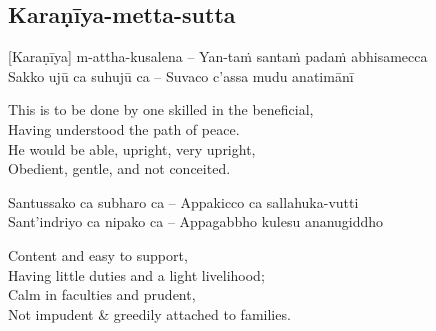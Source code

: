 



\subsection{Karaṇīya-metta-sutta}
\label{karaniya-metta-sutta}
[Karaṇīya] m-attha-kusalena – Yan-taṁ santaṁ padaṁ abhisamecca\\
Sakko ujū ca suhujū ca – Suvaco c’assa mudu anatimānī

\begin{english}
  This is to be done by one skilled in the beneficial,\\
  Having understood the path of peace.\\
  He would be able, upright, very upright,\\
  Obedient, gentle, and not conceited.
\end{english}

Santussako ca subharo ca – Appakicco ca sallahuka-vutti\\
Sant’indriyo ca nipako ca – Appagabbho kulesu ananugiddho

\begin{english}
  Content and easy to support,\\
  Having little duties and a light livelihood;\\
  Calm in faculties and prudent,\\
  Not impudent \& greedily attached to families.
\end{english}

